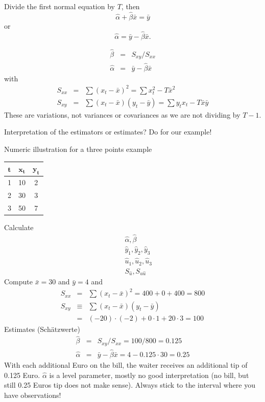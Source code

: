 \documentclass{article}
\begin{document}
Divide the first normal equation by $T$, then%
\[
\hat{\alpha}+\hat{\beta}\bar{x}=\bar{y} 
\]%
or%
\begin{equation}
\hat{\alpha}=\bar{y}-\hat{\beta}\bar{x}.  \label{defalphahat}
\end{equation}




\begin{eqnarray*}
	\hat{\beta} &=&S_{xy}/S_{xx} \\
	\hat{\alpha} &=&\bar{y}-\hat{\beta}\bar{x}
\end{eqnarray*}%
with 
\begin{eqnarray*}
	S_{xx} &=&\sum \left( x_{t}-\bar{x}\right) ^{2}=\sum x_{t}^{2}-T\bar{x}^{2}
	\\
	S_{xy} &=&\sum \left( x_{t}-\bar{x}\right) \left( y_{t}-\bar{y}\right) =\sum
	y_{t}x_{t}-T\bar{x}\bar{y}
\end{eqnarray*}%
These are variations, not variances or covariances as we are not dividing by $T-1$.

Interpretation of the estimators or estimates? Do for our example! 

Numeric illustration for a three points example

\begin{center}%
	\begin{tabular}{|c|c|c|}
		\hline
		$\mathbf{t}$ & $\mathbf{x}_{\mathbf{t}}$ & $\mathbf{y}_{\mathbf{t}}$ \\ 
		\hline
		1 & 10 & 2 \\ 
		2 & 30 & 3 \\ 
		3 & 50 & 7 \\ \hline
	\end{tabular}%
\end{center}%
Calculate
\begin{eqnarray*}
	&&\hat{\alpha},\hat{\beta} \\
	&&\hat{y}_{1},\hat{y}_{2},\hat{y}_{3} \\
	&&\hat{u}_{1},\hat{u}_{2},\hat{u}_{3} \\
	&&S_{\hat{u}}, S_{\hat{u}\hat{u}}
\end{eqnarray*}
Compute $\bar{x}=30$ and $\bar{y}=4$ and%
\begin{eqnarray*}
	S_{xx} &=&\sum \left( x_{t}-\bar{x}\right) ^{2}=400+0+400=800 \\
	S_{xy} &\equiv &\sum \left( x_{t}-\bar{x}\right) \left( y_{t}-\bar{y}\right)
	\\
	&=&(-20)\cdot (-2)+0\cdot 1+20\cdot 3=100
\end{eqnarray*}%
Estimates (Sch\"{a}tzwerte)%
\begin{eqnarray*}
	\hat{\beta} &=&S_{xy}/S_{xx}=100/800=0.125 \\
	\hat{\alpha} &=&\bar{y}-\hat{\beta}\bar{x}=4-0.125\cdot 30=0.25
\end{eqnarray*}%
With each additional Euro on the bill, the waiter receives an additional tip of 0.125 Euro. $\hat{\alpha}$ is a level parameter, mostly no good interpretation (no bill, but still 0.25 Euros tip does not make sense).
Always stick to the interval where you have observations!
\end{document}
